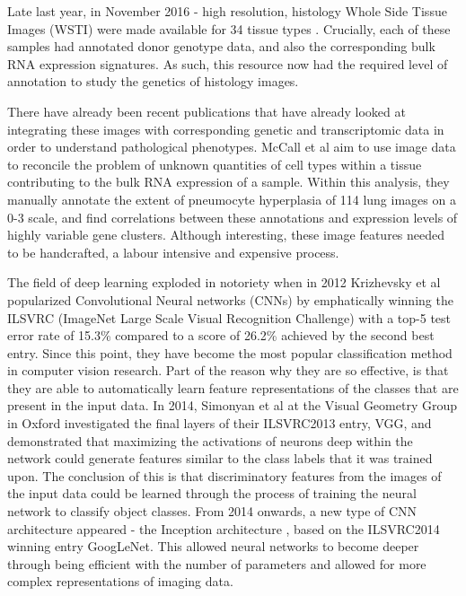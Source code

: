 \documentclass[graybox]{svmult}
\begin{document}
Late last year, in November 2016 - high resolution, histology Whole Side Tissue Images (WSTI) were made available for 34 tissue types \cite{GTEx-histology}. Crucially, each of these samples had annotated donor genotype data, and also the corresponding bulk RNA expression signatures. As such, this resource now had the required level of annotation to study the genetics of histology images. 

There have already been recent publications that have already looked at integrating these images with corresponding genetic and transcriptomic data in order to understand pathological phenotypes.  McCall et al \cite{complex-sources-of-variation} aim to use image data to reconcile the problem of unknown quantities of cell types within a tissue contributing to the bulk RNA expression of a sample. Within this analysis, they manually annotate the extent of pneumocyte hyperplasia of 114 lung images on a 0-3 scale, and find correlations between these annotations and expression levels of highly variable gene clusters. Although interesting, these image features needed to be handcrafted, a labour intensive and expensive process.

The field of deep learning exploded in notoriety when in 2012 Krizhevsky et al \cite{image-net} popularized Convolutional Neural networks (CNNs) by emphatically winning the ILSVRC (ImageNet Large Scale Visual Recognition Challenge) with a top-5 test error rate of 15.3\% compared to a score of 26.2\% achieved by the second best entry. Since this point, they have become the most popular classification method in computer vision research. Part of the reason why they are so effective, is that they are able to automatically learn feature representations of the classes that are present in the input data. In 2014, Simonyan et al \cite{deep-inside-convolutional-networks} at the Visual Geometry Group in Oxford investigated the final layers of their ILSVRC2013 entry, VGG, and demonstrated that maximizing the activations of neurons deep within the network could generate features similar to the class labels that it was trained upon. The conclusion of this is that discriminatory features from the images of the input data could be learned through the process of training the neural network to classify object classes. From 2014 onwards, a new type of CNN architecture appeared - the Inception architecture \cite{network-in-network}, based on the ILSVRC2014 winning entry GoogLeNet. This allowed neural networks to become deeper through being efficient with the number of parameters and allowed for more complex representations of imaging data.
\end{document}
